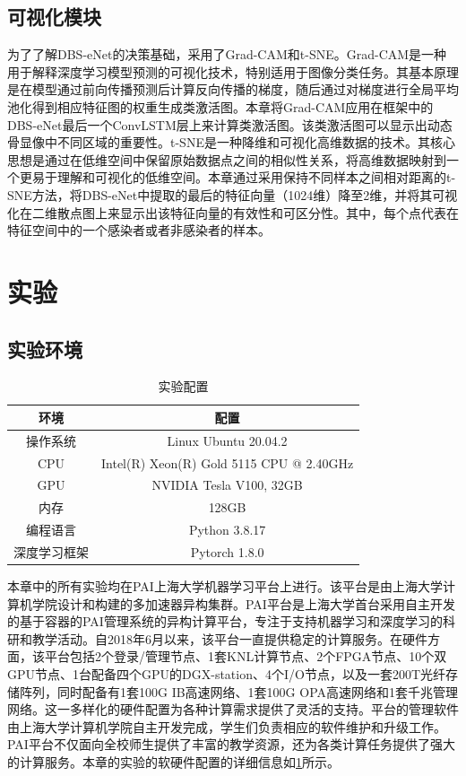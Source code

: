 \subsection{可视化模块}

为了了解DBS-eNet的决策基础，采用了Grad-CAM和t-SNE。Grad-CAM是一种用于解释深度学习模型预测的可视化技术，特别适用于图像分类任务。其基本原理是在模型通过前向传播预测后计算反向传播的梯度，随后通过对梯度进行全局平均池化得到相应特征图的权重生成类激活图。本章将Grad-CAM应用在框架中的DBS-eNet最后一个ConvLSTM层上来计算类激活图。该类激活图可以显示出动态骨显像中不同区域的重要性。t-SNE是一种降维和可视化高维数据的技术。其核心思想是通过在低维空间中保留原始数据点之间的相似性关系，将高维数据映射到一个更易于理解和可视化的低维空间。本章通过采用保持不同样本之间相对距离的t-SNE方法，将DBS-eNet中提取的最后的特征向量（1024维）降至2维，并将其可视化在二维散点图上来显示出该特征向量的有效性和可区分性。其中，每个点代表在特征空间中的一个感染者或者非感染者的样本。

\section{实验}

\subsection{实验环境}

\begin{table}[htbp]
  \centering
  \caption{实验配置}
  \begin{tabular}{cc}
    \toprule
    环境         & 配置                                     \\
    \midrule
    操作系统     & Linux Ubuntu 20.04.2                     \\
    CPU          & Intel(R) Xeon(R) Gold 5115 CPU @ 2.40GHz \\
    GPU          & NVIDIA Tesla V100, 32GB                  \\
    内存         & 128GB                                    \\
    编程语言     & Python 3.8.17                            \\
    深度学习框架 & Pytorch 1.8.0                            \\
    \bottomrule
  \end{tabular}
  \label{tab:chap03_experimental_config}
\end{table}

本章中的所有实验均在PAI上海大学机器学习平台上进行。该平台是由上海大学计算机学院设计和构建的多加速器异构集群。PAI平台是上海大学首台采用自主开发的基于容器的PAI管理系统的异构计算平台，专注于支持机器学习和深度学习的科研和教学活动。自2018年6月以来，该平台一直提供稳定的计算服务。在硬件方面，该平台包括2个登录/管理节点、1套KNL计算节点、2个FPGA节点、10个双GPU节点、1台配备四个GPU的DGX-station、4个I/O节点，以及一套200T光纤存储阵列，同时配备有1套100G IB高速网络、1套100G OPA高速网络和1套千兆管理网络。这一多样化的硬件配置为各种计算需求提供了灵活的支持。平台的管理软件由上海大学计算机学院自主开发完成，学生们负责相应的软件维护和升级工作。PAI平台不仅面向全校师生提供了丰富的教学资源，还为各类计算任务提供了强大的计算服务。本章的实验的软硬件配置的详细信息如\ref{tab:chap03_experimental_config}所示。

